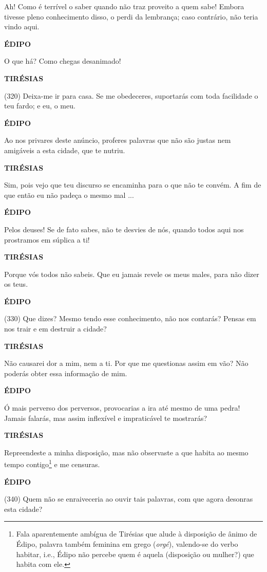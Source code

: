 Ah! Como é terrível o saber quando não traz proveito a quem sabe! Embora
tivesse pleno conhecimento disso, o perdi da lembrança; caso contrário,
não teria vindo aqui.

\textbf{ÉDIPO}

O que há? Como chegas desanimado!

\textbf{TIRÉSIAS}

(320) Deixa-me ir para casa. Se me obedeceres, suportarás com toda
facilidade o teu fardo; e eu, o meu.

\textbf{ÉDIPO}

Ao nos privares deste anúncio, proferes palavras que não são justas nem
amigáveis a esta cidade, que te nutriu.

\textbf{TIRÉSIAS}

Sim, pois vejo que teu discurso se encaminha para o que não te convém. A
fim de que então eu não padeça o mesmo mal ...

\textbf{ÉDIPO}

Pelos deuses! Se de fato sabes, não te desvies de nós, quando todos aqui
nos prostramos em súplica a ti!

\textbf{TIRÉSIAS}

Porque vós todos não sabeis. Que eu jamais revele os meus males, para
não dizer os teus.

\textbf{ÉDIPO}

(330) Que dizes? Mesmo tendo esse conhecimento, não nos contarás? Pensas
em nos trair e em destruir a cidade?

\textbf{TIRÉSIAS}

Não causarei dor a mim, nem a ti. Por que me questionas assim em vão?
Não poderás obter essa informação de mim.

\textbf{ÉDIPO}

Ó mais perverso dos perversos, provocarias a ira até mesmo de uma pedra!
Jamais falarás, mas assim inflexível e impraticável te mostrarás?

\textbf{TIRÉSIAS}

Repreendeste a minha disposição, mas não observaste a que habita ao
mesmo tempo contigo\footnote{Fala aparentemente ambígua de Tirésias que
  alude à disposição de ânimo de Édipo, palavra também feminina em grego
  (\emph{orgé}), valendo-se do verbo habitar, i.e., Édipo não percebe
  quem é aquela (disposição ou mulher?) que habita com ele.} e me
censuras.

\textbf{ÉDIPO}

(340) Quem não se enraiveceria ao ouvir tais palavras, com que agora
desonras esta cidade?

